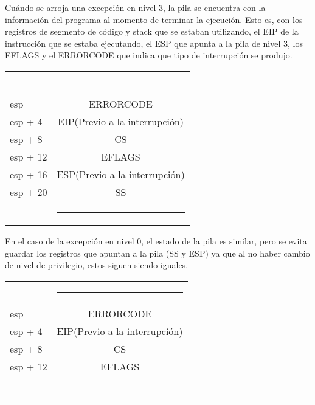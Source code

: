 Cuándo se arroja una excepción en nivel 3, la pila se encuentra con la información del programa al momento de terminar la ejecución. Esto es, con los registros de segmento de código y stack que se estaban utilizando, el EIP de la instrucción que se estaba ejecutando, el ESP que apunta a la pila de nivel 3, los EFLAGS y el ERRORCODE que indica que tipo de interrupción se produjo.
\begin{center}
  \begin{tabular*}{200mm}{l|c|}
  & \rule[0.25cm]{80mm}{0.01cm}\\
  esp & ERRORCODE\\
  esp + 4 & EIP(Previo a la interrupción)\\
  esp + 8 & CS\\
  esp + 12 & EFLAGS\\
  esp + 16 & ESP(Previo a la interrupción)\\
  esp + 20 & SS\\
  & \rule[-0.2cm]{80mm}{0.01cm}\\
  \end{tabular*}
\end{center}

En el caso de la excepción en nivel 0, el estado de la pila es similar, pero se evita guardar los registros que apuntan a la pila (SS y ESP) ya que al no haber cambio de nivel de privilegio, estos siguen siendo iguales.

\begin{center}
  \begin{tabular*}{200mm}{l|c|}
  & \rule[0.25cm]{80mm}{0.01cm}\\
  esp & ERRORCODE\\
  esp + 4 & EIP(Previo a la interrupción)\\
  esp + 8 & CS\\
  esp + 12 & EFLAGS\\
  & \rule[-0.2cm]{80mm}{0.01cm}\\
  \end{tabular*}
\end{center}
